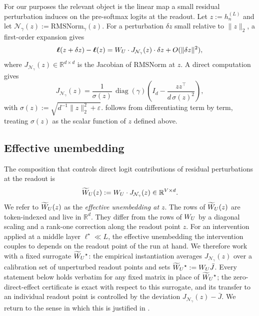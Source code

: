 \documentclass[11pt,letterpaper]{article}
\theoremstyle{plain}
\theoremstyle{definition}
\DeclareMathOperator{\diag}{diag}
\newcommand{\R}{\mathbb{R}}
\newcommand{\1}{\mathbf{1}}
\newcommand{\WU}{W_{U}\mathchoice{}{}{}{}}
\newcommand{\WUt}{\widetilde{W}_{U}\mathchoice{}{}{}{}}
\newcommand{\hres}{h}
\begin{document}
For our purposes the relevant object is the linear map a small residual perturbation induces on the pre-softmax logits at the readout. Let $z := \hres^{(L)}_n$ and let $\mathcal{N}_\gamma(z) := \mathrm{RMSNorm}_\gamma(z)$. For a perturbation $\delta z$ small relative to $\|z\|_2$, a first-order expansion gives
\begin{equation}
\bm{\ell}(z + \delta z) - \bm{\ell}(z) = \WU \cdot J_{\mathcal{N}_\gamma}(z) \cdot \delta z + O(\|\delta z\|^2),
\label{eq:firstorder}
\end{equation}
where $J_{\mathcal{N}_\gamma}(z) \in \R^{d \times d}$ is the Jacobian of RMSNorm at $z$. A direct computation gives
\begin{equation}
J_{\mathcal{N}_\gamma}(z) = \frac{1}{\sigma(z)}\,\diag(\gamma)\left(I_d - \frac{z z^\top}{d\,\sigma(z)^2}\right),
\label{eq:rmsjacobian}
\end{equation}
with $\sigma(z) := \sqrt{d^{-1}\|z\|_2^2 + \varepsilon}$.  follows from differentiating  term by term, treating $\sigma(z)$ as the scalar function of $z$ defined above.

\subsection{Effective unembedding}

The composition that controls direct logit contributions of residual perturbations at the readout is
\begin{equation}
\WUt(z) := \WU \cdot J_{\mathcal{N}_\gamma}(z) \in \R^{V \times d}.
\label{eq:effective}
\end{equation}
We refer to $\WUt(z)$ as the \emph{effective unembedding at $z$}. The rows of $\WUt(z)$ are token-indexed and live in $\R^d$. They differ from the rows of $\WU$ by a diagonal scaling and a rank-one correction along the readout point $z$. For an intervention applied at a middle layer $\ell^\star \ll L$, the effective unembedding the intervention couples to depends on the readout point of the run at hand. We therefore work with a fixed surrogate $\WUt^\star$: the empirical instantiation averages $J_{\mathcal{N}_\gamma}(z)$ over a calibration set of unperturbed readout points and sets $\WUt^\star := \WU \bar{J}$. Every statement below holds verbatim for any fixed matrix in place of $\WUt^\star$; the zero-direct-effect certificate is exact with respect to this surrogate, and its transfer to an individual readout point is controlled by the deviation $J_{\mathcal{N}_\gamma}(z) - \bar{J}$. We return to the sense in which this is justified in .
\end{document}
